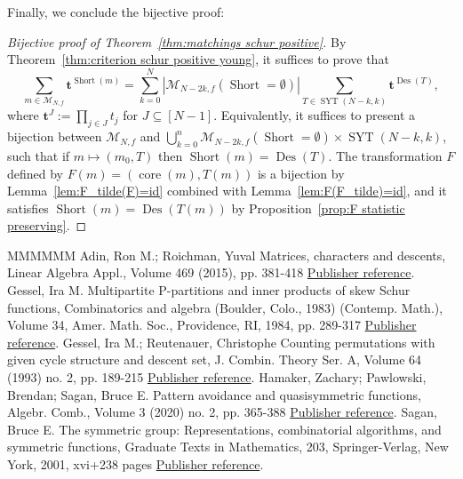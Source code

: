 \documentclass[11pt]{article}
\theoremstyle{definition}
\numberwithin{equation}{section}
\newcommand{\Des}{\operatorname{Des}}
\newcommand{\Syt}{\operatorname{SYT}}
\newcommand{\Short}{\operatorname{Short}}
\newcommand{\core}{\operatorname{core}}
\newcommand{\M}{\mathcal{M}}
\begin{document}
Finally, we conclude the bijective proof:
\begin{proof}[Bijective proof of Theorem~\ref{thm:matchings schur positive}]
    By Theorem~\ref{thm:criterion schur positive young}, it suffices to prove that
    \[
        \sum_{m \in \M_{N,f}} \boldsymbol{t}^{\Short(m)} = \sum_{k=0}^N |\M_{N-2k,f}(\Short = \emptyset)| \sum_{T \in \Syt(N-k,k)} \boldsymbol{t}^{\Des(T)},
    \]
    where $\boldsymbol{t}^J := \prod_{j \in J} t_j$ for $J \subseteq [N-1]$.
    Equivalently, it suffices to present a bijection between $\M_{N,f}$ and $\bigcup_{k=0}^n \M_{N-2k,f}(\Short = \emptyset) \times \Syt(N-k,k)$, such that if $m \mapsto (m_0,T)$ then $\Short(m) = \Des(T)$. The transformation $F$ defined by $F(m) = (\core(m),T(m))$ is a bijection by Lemma~\ref{lem:F_tilde(F)=id} combined with Lemma~\ref{lem:F(F_tilde)=id}, and it satisfies $\Short(m) = \Des(T(m))$ by Proposition~\ref{prop:F statistic preserving}.
\end{proof}

\begin{thebibliography}{MMMMMM}
 Adin, Ron M.; Roichman, Yuval Matrices, characters and descents, Linear Algebra Appl., Volume 469 (2015), pp. 381-418 \href{https://alco.centre-mersenne.org/articles/10.5802/alco.351/#adin_roichman_fine_set}{Publisher reference}.
 Gessel, Ira M. Multipartite P-partitions and inner products of skew Schur functions, Combinatorics and algebra (Boulder, Colo., 1983) (Contemp. Math.), Volume 34, Amer. Math. Soc., Providence, RI, 1984, pp. 289-317 \href{https://alco.centre-mersenne.org/articles/10.5802/alco.351/#knuth_classes_schur_positive}{Publisher reference}.
 Gessel, Ira M.; Reutenauer, Christophe Counting permutations with given cycle structure and descent set, J. Combin. Theory Ser. A, Volume 64 (1993) no. 2, pp. 189-215 \href{https://alco.centre-mersenne.org/articles/10.5802/alco.351/#gessel1993counting}{Publisher reference}.
 Hamaker, Zachary; Pawlowski, Brendan; Sagan, Bruce E. Pattern avoidance and quasisymmetric functions, Algebr. Comb., Volume 3 (2020) no. 2, pp. 365-388 \href{https://alco.centre-mersenne.org/articles/10.5802/alco.351/#S3_patterns_list}{Publisher reference}.
 Sagan, Bruce E. The symmetric group: Representations, combinatorial algorithms, and symmetric functions, Graduate Texts in Mathematics, 203, Springer-Verlag, New York, 2001, xvi+238 pages \href{https://alco.centre-mersenne.org/articles/10.5802/alco.351/#sagan_book}{Publisher reference}.
\end{thebibliography}
\end{document}
